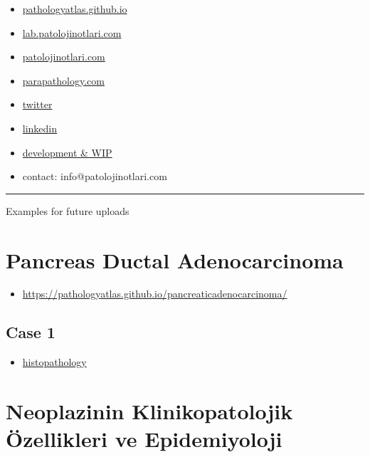 \documentclass[
  letterpaper,
  DIV=11,
  numbers=noendperiod]{scrreprt}
\providecommand{\tightlist}{%
  \setlength{\itemsep}{0pt}\setlength{\parskip}{0pt}}
\begin{document}
\begin{itemize}
\item
  \href{https://pathologyatlas.github.io/}{pathologyatlas.github.io}
\item
  \href{https://lab.patolojinotlari.com}{lab.patolojinotlari.com}
\item
  \href{https://patolojinotlari.com}{patolojinotlari.com}
\item
  \href{https://parapathology.com}{parapathology.com}
\item
  \href{https://twitter.com/patolojinotlari}{twitter}
\item
  \href{https://www.linkedin.com/company/patoloji-notlari}{linkedin}
\item
  \href{https://pathologyatlas.github.io/development.md}{development \&
  WIP}
\item
  contact: info@patolojinotlari.com
\end{itemize}

\begin{center}\rule{0.5\linewidth}{0.5pt}\end{center}

Examples for future uploads

\hypertarget{pancreas-ductal-adenocarcinoma}{%
\chapter{Pancreas Ductal
Adenocarcinoma}\label{pancreas-ductal-adenocarcinoma}}

\begin{itemize}
\tightlist
\item
  \url{https://pathologyatlas.github.io/pancreaticadenocarcinoma/}
\end{itemize}

\hypertarget{case-1}{%
\section{Case 1}\label{case-1}}

\begin{itemize}
\tightlist
\item
  \href{https://pathologyatlas.github.io/pancreaticadenocarcinoma/case1-histopathology/viewer_z0.html}{histopathology}
\end{itemize}

\hypertarget{neoplazinin-klinikopatolojik-uxf6zellikleri-ve-epidemiyoloji}{%
\chapter{Neoplazinin Klinikopatolojik Özellikleri ve
Epidemiyoloji}\label{neoplazinin-klinikopatolojik-uxf6zellikleri-ve-epidemiyoloji}}
\end{document}
